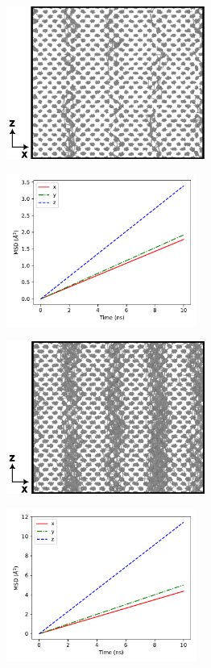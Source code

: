 \documentclass{elsarticle}
\begin{document}
\begin{figure}[!ht]
\centering
	\begin{subfigure}{0.49\textwidth}
		\centering
		\caption{}
		\includegraphics[height=5cm]{190at700cs.png}
	\end{subfigure}
	\begin{subfigure}{0.49\textwidth}
		\centering
		\caption{}
		\includegraphics[height=5cm]{190at700xyz.pdf}
	\end{subfigure}
    \par\medskip
	\begin{subfigure}{0.49\textwidth}
		\centering
		\caption{}
		\includegraphics[height=5cm]{190at1100cs.png}
	\end{subfigure}
	\begin{subfigure}{0.49\textwidth}
		\centering
		\caption{}
		\includegraphics[height=5cm]{190at1100xyz.pdf}

\end{subfigure}
\end{figure}
\end{document}
